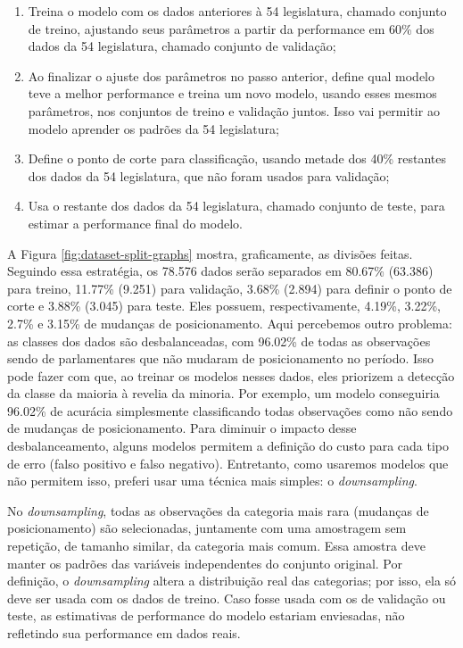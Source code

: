 \documentclass[a4paper,titlepage]{ppgi}\usepackage[]{graphicx}\usepackage[]{color}
\begin{document}
\begin{enumerate}
\item Treina o modelo com os dados anteriores à 54\textordfeminine{}
legislatura, chamado conjunto de treino, ajustando seus parâmetros a partir
da performance em 60\% dos dados da 54\textordfeminine{} legislatura, chamado
conjunto de validação;
\item Ao finalizar o ajuste dos parâmetros no passo anterior, define qual
modelo teve a melhor performance e treina um novo modelo, usando esses mesmos
parâmetros, nos conjuntos de treino e validação juntos. Isso vai permitir ao
modelo aprender os padrões da 54\textordfeminine{} legislatura;
\item Define o ponto de corte para classificação, usando metade dos 40\%
restantes dos dados da 54\textordfeminine{} legislatura, que não foram usados
para validação;
\item Usa o restante dos dados da 54\textordfeminine{} legislatura, chamado
conjunto de teste, para estimar a performance final do modelo.
\end{enumerate}

A Figura \ref{fig:dataset-split-graphs} mostra, graficamente, as divisões
feitas. Seguindo essa estratégia, os 78.576 dados serão separados em
80.67\%
(63.386) para treino,
11.77\%
(9.251) para validação,
3.68\%
(2.894) para definir o ponto de corte e
3.88\% (3.045) para
teste. Eles possuem, respectivamente,
4.19\%,
3.22\%,
2.7\% e
3.15\% de mudanças de posicionamento.
Aqui percebemos outro problema: as classes dos dados são desbalanceadas, com
96.02\% de todas as observações sendo de
parlamentares que não mudaram de posicionamento no período. Isso pode fazer com
que, ao treinar os modelos nesses dados, eles priorizem a detecção da classe da
maioria à revelia da minoria. Por exemplo, um modelo conseguiria
96.02\% de acurácia simplesmente
classificando todas observações como não sendo de mudanças de posicionamento.
Para diminuir o impacto desse desbalanceamento, alguns modelos permitem a
definição do custo para cada tipo de erro (falso positivo e falso negativo).
Entretanto, como usaremos modelos que não permitem isso, preferi usar uma
técnica mais simples: o \emph{downsampling}.

No \emph{downsampling}, todas as observações da categoria mais rara (mudanças de
posicionamento) são selecionadas, juntamente com uma amostragem sem repetição,
de tamanho similar, da categoria mais comum. Essa amostra deve manter os padrões
das variáveis independentes do conjunto original. Por definição, o
\emph{downsampling} altera a distribuição real das categorias; por isso, ela só
deve ser usada com os dados de treino. Caso fosse usada com os de validação ou
teste, as estimativas de performance do modelo estariam enviesadas, não
refletindo sua performance em dados reais.  
\end{document}
